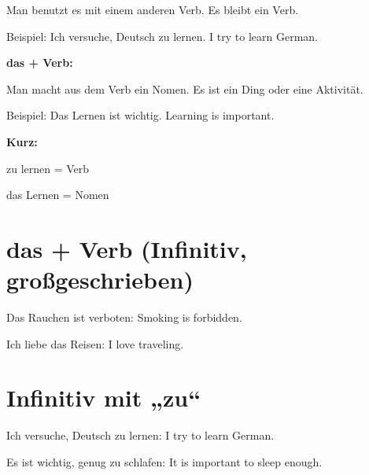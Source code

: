 \documentclass[a4paper]{article}
\title{}
\date{}
\begin{document}
    \maketitle
    
    Man benutzt es mit einem anderen Verb.
    Es bleibt ein Verb.
    
    Beispiel:
    Ich versuche, Deutsch zu lernen.
    I try to learn German.
    
    \bigskip
    
    \textbf{das + Verb:}
    
    Man macht aus dem Verb ein Nomen.
    Es ist ein Ding oder eine Aktivität.
    
    Beispiel:
    Das Lernen ist wichtig.
    Learning is important.
    
    \bigskip
    
    \textbf{Kurz:}
    
    zu lernen = Verb
    
    das Lernen = Nomen
    
    
    \section{das + Verb (Infinitiv, großgeschrieben)}
        Das Rauchen ist verboten: Smoking is forbidden.
        
        Ich liebe das Reisen: I love traveling.
    
    
    \section{Infinitiv mit „zu“}
        Ich versuche, Deutsch zu lernen: I try to learn German.
        
        Es ist wichtig, genug zu schlafen: It is important to sleep enough.
\end{document}
